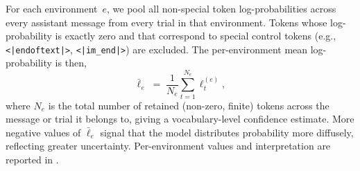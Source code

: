   For each environment~$e$, we pool all non-special token log-probabilities
  across every assistant message from every trial in that environment. Tokens
  whose log-probability is exactly zero and that correspond to
  special control tokens (e.g., \texttt{<|endoftext|>},
  \texttt{<|im\_end|>}) are excluded. The
  per-environment mean log-probability is then,
  \begin{equation}
    \bar{\ell}_e \;=\; \frac{1}{N_e}\sum_{t=1}^{N_e} \ell_t^{(e)},
    \label{eq:mean-logprob}
  \end{equation}
  where $N_e$ is the total number of retained (non-zero, finite) tokens across the message or trial it belongs to, giving a vocabulary-level confidence estimate. More negative values of $\bar{\ell}_e$ signal that the model distributes probability more diffusely, reflecting greater uncertainty. Per-environment values and interpretation are reported in .